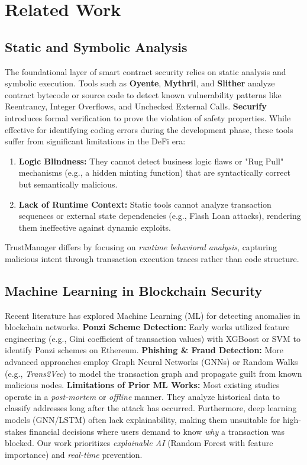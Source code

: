 \section{Related Work}

\subsection{Static and Symbolic Analysis}
The foundational layer of smart contract security relies on static analysis and symbolic execution. Tools such as \textbf{Oyente}, \textbf{Mythril}, and \textbf{Slither} analyze contract bytecode or source code to detect known vulnerability patterns like Reentrancy, Integer Overflows, and Unchecked External Calls. \textbf{Securify} introduces formal verification to prove the violation of safety properties. 
While effective for identifying coding errors during the development phase, these tools suffer from significant limitations in the DeFi era:
\begin{enumerate}
    \item \textbf{Logic Blindness:} They cannot detect business logic flaws or "Rug Pull" mechanisms (e.g., a hidden minting function) that are syntactically correct but semantically malicious.
    \item \textbf{Lack of Runtime Context:} Static tools cannot analyze transaction sequences or external state dependencies (e.g., Flash Loan attacks), rendering them ineffective against dynamic exploits.
\end{enumerate}
TrustManager differs by focusing on \textit{runtime behavioral analysis}, capturing malicious intent through transaction execution traces rather than code structure.

\subsection{Machine Learning in Blockchain Security}
Recent literature has explored Machine Learning (ML) for detecting anomalies in blockchain networks. 
\textbf{Ponzi Scheme Detection:} Early works utilized feature engineering (e.g., Gini coefficient of transaction values) with XGBoost or SVM to identify Ponzi schemes on Ethereum.
\textbf{Phishing & Fraud Detection:} More advanced approaches employ Graph Neural Networks (GNNs) or Random Walks (e.g., \textit{Trans2Vec}) to model the transaction graph and propagate guilt from known malicious nodes.
\textbf{Limitations of Prior ML Works:} Most existing studies operate in a \textit{post-mortem} or \textit{offline} manner. They analyze historical data to classify addresses long after the attack has occurred. Furthermore, deep learning models (GNN/LSTM) often lack explainability, making them unsuitable for high-stakes financial decisions where users demand to know \textit{why} a transaction was blocked. Our work prioritizes \textit{explainable AI} (Random Forest with feature importance) and \textit{real-time} prevention.

